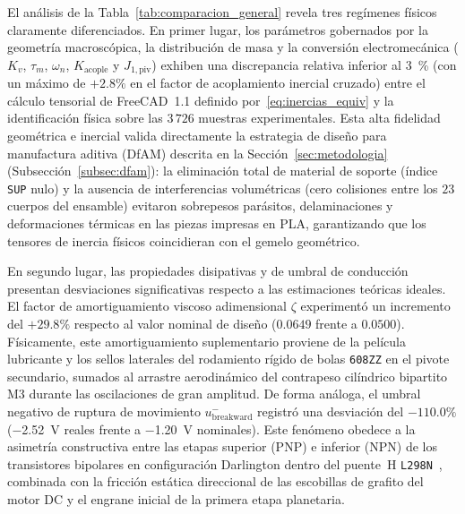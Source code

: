 El análisis de la Tabla~\ref{tab:comparacion_general} revela tres regímenes físicos claramente diferenciados. En primer lugar, los parámetros gobernados por la geometría macroscópica, la distribución de masa y la conversión electromecánica ($K_v$, $\tau_m$, $\omega_n$, $K_{\text{acople}}$ y $J_{1,\text{piv}}$) exhiben una discrepancia relativa inferior al \qty{3}{\percent} (con un máximo de $+2.8\%$ en el factor de acoplamiento inercial cruzado) entre el cálculo tensorial de FreeCAD~1.1 definido por~\eqref{eq:inercias_equiv} y la identificación física sobre las $3\,726$ muestras experimentales. Esta alta fidelidad geométrica e inercial valida directamente la estrategia de diseño para manufactura aditiva (DfAM) descrita en la Sección~\ref{sec:metodologia} (Subsección~\ref{subsec:dfam}): la eliminación total de material de soporte (índice \texttt{SUP} nulo) y la ausencia de interferencias volumétricas (cero colisiones entre los $23$ cuerpos del ensamble) evitaron sobrepesos parásitos, delaminaciones y deformaciones térmicas en las piezas impresas en PLA, garantizando que los tensores de inercia físicos coincidieran con el gemelo geométrico.

En segundo lugar, las propiedades disipativas y de umbral de conducción presentan desviaciones significativas respecto a las estimaciones teóricas ideales. El factor de amortiguamiento viscoso adimensional $\zeta$ experimentó un incremento del $+29.8\%$ respecto al valor nominal de diseño ($0.0649$ frente a $0.0500$). Físicamente, este amortiguamiento suplementario proviene de la película lubricante y los sellos laterales del rodamiento rígido de bolas \texttt{608ZZ} en el pivote secundario, sumados al arrastre aerodinámico del contrapeso cilíndrico bipartito M3 durante las oscilaciones de gran amplitud. De forma análoga, el umbral negativo de ruptura de movimiento $u_{\text{breakward}}^{-}$ registró una desviación del $-110.0\%$ (\qty{-2.52}{\volt} reales frente a \qty{-1.20}{\volt} nominales). Este fenómeno obedece a la asimetría constructiva entre las etapas superior (PNP) e inferior (NPN) de los transistores bipolares en configuración Darlington dentro del puente~H \texttt{L298N}~\cite{L298N_Datasheet}, combinada con la fricción estática direccional de las escobillas de grafito del motor DC y el engrane inicial de la primera etapa planetaria.

